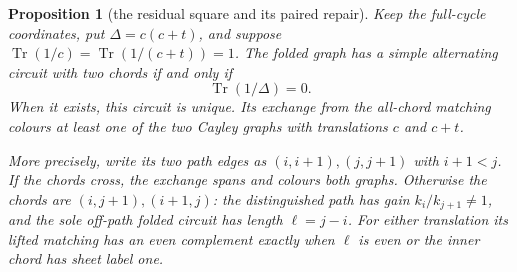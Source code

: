\documentclass[11pt,a4paper]{article}
\newtheorem{proposition}[theorem]{Proposition}
\theoremstyle{definition}
\theoremstyle{remark}
\begin{document}
\begin{proposition}[the residual square and its paired repair]\label{prop:borel-square}
Keep the full-cycle coordinates, put $\Delta=c(c+t)$, and suppose
$\operatorname{Tr}(1/c)=\operatorname{Tr}(1/(c+t))=1$.
The folded graph has a simple alternating circuit with two chords if and only if
\[
                         \operatorname{Tr}(1/\Delta)=0.
\]
When it exists, this circuit is unique.  Its exchange from the all-chord matching colours at least one of the two Cayley graphs with translations $c$ and $c+t$.

More precisely, write its two path edges as $(i,i+1),(j,j+1)$ with $i+1<j$.  If the chords cross, the exchange spans and colours both graphs.  Otherwise the chords are $(i,j+1),(i+1,j)$: the distinguished path has gain $k_i/k_{j+1}\ne1$, and the sole off-path folded circuit has length $\ell=j-i$.  For either translation its lifted matching has an even complement exactly when $\ell$ is even or the inner chord has sheet label one.
\end{proposition}
\end{document}

